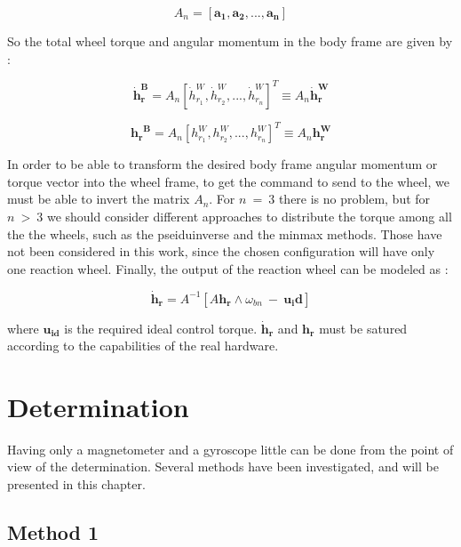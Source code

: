 \documentclass[11pt,a4paper]{report}
\begin{document}
\begin{equation*}
 \mathit{A_{n}} = [\mathbf{a_{1}}, \mathbf{a_{2}},...,\mathbf{a_{n}}]
\end{equation*}

So the total wheel torque and angular momentum in the body frame are given by : 

\begin{equation}
 \mathbf{\dot{h}_{r}^B} = \mathit{A_{n}}[\mathit{\dot{h}_{r_{1}}^W},\mathit{\dot{h}_{r_{2}}^W},...,\mathit{\dot{h}_{r_{n}}^W}]^{T} \equiv \mathit{A_{n}} \mathbf{\dot{h}_{r}^W}
\end{equation}

\begin{equation}
 \mathbf{{h_{r}}^B} = \mathit{A_{n}}[\mathit{{h_{r_{1}}^W}},\mathit{{h_{r_{2}}^W}},...,\mathit{{h_{r_{n}}^W}}]^{T} \equiv \mathit{A_{n}} \mathbf{{h_{r}^W}}
\end{equation}

In order to be able to transform the desired body frame angular momentum or torque vector into the wheel frame, to get the command to send to the wheel, we must be able to invert the matrix $\mathit{A_{n}}$. For $n \ = \ 3$ there is no problem, but for $n \ > \ 3$ we should consider different approaches to distribute the torque among all the the wheels, such as the pseiduinverse and the minmax methods. Those have not been considered in this work, since the chosen configuration will have only one reaction wheel.
Finally, the output of the reaction wheel can be modeled as : 

\begin{equation}
 \mathbf{\dot{h}_r} = \mathit{A}^{-1} [A\mathbf{h_r} \wedge \omega_{bn} \ - \ \mathbf{u_id}]
\end{equation}

where $\mathbf{u_{id}}$ is the required ideal control torque. 
$\mathbf{\dot{h}_r}$ and $\mathbf{{h}_r}$ must be satured according to the capabilities of the real hardware.

\chapter{Determination}
Having only a magnetometer and a gyroscope little can be done from the point of view of the determination.
Several methods have been investigated, and will be presented in this chapter.
\section{Method 1}
\end{document}
